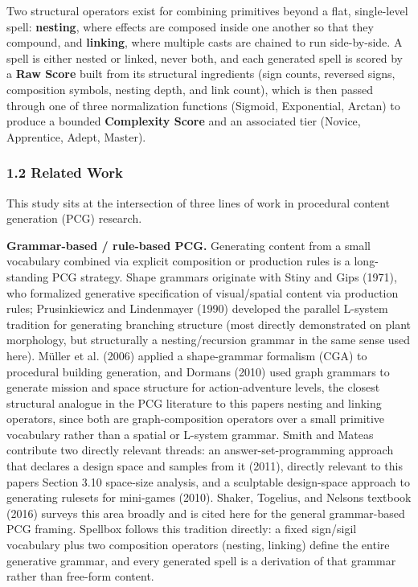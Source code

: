 \documentclass[
  10pt,
  twocolumn]{article}
\begin{document}
Two structural operators exist for combining primitives beyond a flat,
single-level spell: \textbf{nesting}, where effects are composed inside
one another so that they compound, and \textbf{linking}, where multiple
casts are chained to run side-by-side. A spell is either nested or
linked, never both, and each generated spell is scored by a \textbf{Raw
Score} built from its structural ingredients (sign counts, reversed
signs, composition symbols, nesting depth, and link count), which is
then passed through one of three normalization functions (Sigmoid,
Exponential, Arctan) to produce a bounded \textbf{Complexity Score} and
an associated tier (Novice, Apprentice, Adept, Master).

\subsubsection{1.2 Related Work}\label{12-related-work}

This study sits at the intersection of three lines of work in procedural
content generation (PCG) research.

\textbf{Grammar-based / rule-based PCG.} Generating content from a small
vocabulary combined via explicit composition or production rules is a
long-standing PCG strategy. Shape grammars originate with Stiny and Gips
(1971), who formalized generative specification of visual/spatial
content via production rules; Prusinkiewicz and Lindenmayer (1990)
developed the parallel L-system tradition for generating branching
structure (most directly demonstrated on plant morphology, but
structurally a nesting/recursion grammar in the same sense used here).
Müller et al. (2006) applied a shape-grammar formalism (CGA) to
procedural building generation, and Dormans (2010) used graph grammars
to generate mission and space structure for action-adventure levels, the
closest structural analogue in the PCG literature to this
paper\textquotesingle s nesting and linking operators, since both are
graph-composition operators over a small primitive vocabulary rather
than a spatial or L-system grammar. Smith and Mateas contribute two
directly relevant threads: an answer-set-programming approach that
declares a design space and samples from it (2011), directly relevant to
this paper\textquotesingle s Section 3.10 space-size analysis, and a
sculptable design-space approach to generating rulesets for mini-games
(2010). Shaker, Togelius, and Nelson\textquotesingle s textbook (2016)
surveys this area broadly and is cited here for the general
grammar-based PCG framing. Spellbox follows this tradition directly: a
fixed sign/sigil vocabulary plus two composition operators (nesting,
linking) define the entire generative grammar, and every generated spell
is a derivation of that grammar rather than free-form content.
\end{document}
